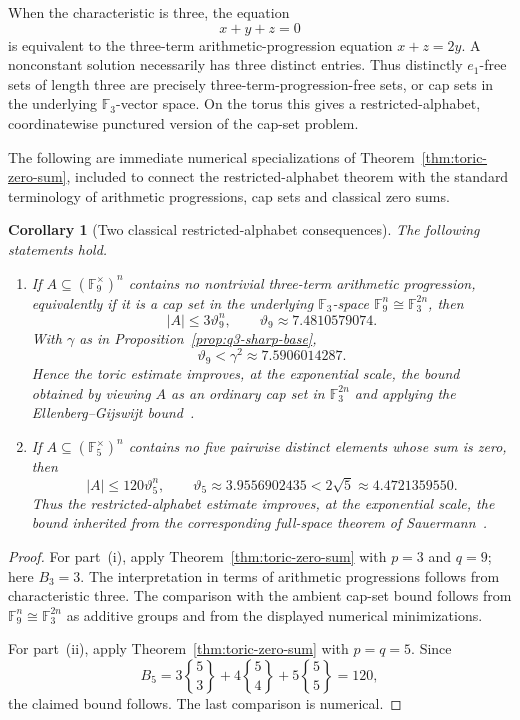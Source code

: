 \documentclass[10pt,a4paper]{amsart}
\newtheorem{corollary}[theorem]{Corollary}
\theoremstyle{definition}
\newcommand{\F}{\mathbb F}
\newcommand{\1}{\mathbf 1}
\newcommand{\StirlingTwo}[2]{\genfrac\{\}{0pt}{}{#1}{#2}}
\begin{document}
When the characteristic is three, the equation
\[
 x+y+z=0
\]
is equivalent to the three-term arithmetic-progression equation $x+z=2y$.  A nonconstant solution necessarily has three distinct entries.  Thus distinctly $e_1$-free sets of length three are precisely three-term-progression-free sets, or cap sets in the underlying $\F_3$-vector space.  On the torus this gives a restricted-alphabet, coordinatewise punctured version of the cap-set problem.

The following are immediate numerical specializations of Theorem~\ref{thm:toric-zero-sum}, included to connect the restricted-alphabet theorem with the standard terminology of arithmetic progressions, cap sets and classical zero sums.

\begin{corollary}[Two classical restricted-alphabet consequences]\label{cor:toric-classical-consequences}
The following statements hold.
\begin{enumerate}[label=\textup{(\roman*)}]
\item If $A\subseteq(\F_9^\times)^n$ contains no nontrivial three-term arithmetic progression, equivalently if it is a cap set in the underlying $\F_3$-space $\F_9^n\cong\F_3^{2n}$, then
\[
 |A|\le3\vartheta_9^n,
 \qquad\vartheta_9\approx7.4810579074.
\]
{With $\gamma$ as in Proposition~\ref{prop:q3-sharp-base},
\[
 \vartheta_9<\gamma^2\approx7.5906014287.
\]}
Hence the toric estimate improves, at the exponential scale, the bound obtained by viewing $A$ as an ordinary cap set in $\F_3^{2n}$ and applying the Ellenberg--Gijswijt bound~\cite{EllenbergGijswijt}.

\item If $A\subseteq(\F_5^\times)^n$ contains no five pairwise distinct elements whose sum is zero, then
\[
 |A|\le120\vartheta_5^n,
 \qquad\vartheta_5\approx3.9556902435<2\sqrt5\approx4.4721359550.
\]
Thus the restricted-alphabet estimate improves, at the exponential scale, the bound inherited from the corresponding full-space theorem of Sauermann~\cite{SauermannDistinct}.
\end{enumerate}
\end{corollary}

\begin{proof}
For part~\textup{(i)}, apply Theorem~\ref{thm:toric-zero-sum} with $p=3$ and $q=9$; here $B_3=3$.  The interpretation in terms of arithmetic progressions follows from characteristic three.  The comparison with the ambient cap-set bound follows from $\F_9^n\cong\F_3^{2n}$ as additive groups and from the displayed numerical minimizations.

For part~\textup{(ii)}, apply Theorem~\ref{thm:toric-zero-sum} with $p=q=5$.  Since
\[
 B_5=3\StirlingTwo{5}{3}+4\StirlingTwo{5}{4}+5\StirlingTwo{5}{5}=120,
\]
the claimed bound follows.  The last comparison is numerical.
\end{proof}
\end{document}
